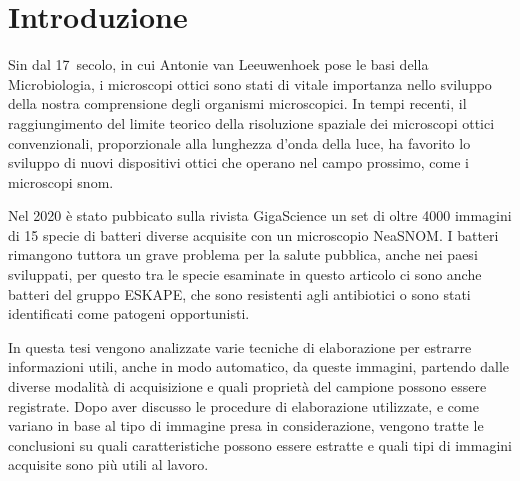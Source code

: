 \documentclass[../main.tex]{subfiles}
\begin{document}
\chapter*{Introduzione}
Sin dal 17\textdegree\ secolo, in cui Antonie van Leeuwenhoek pose le basi della Microbiologia\cite{lane_2015, dobell_1923, corliss_1975}, i microscopi ottici sono stati di vitale importanza nello sviluppo della nostra comprensione degli organismi microscopici.
In tempi recenti, il raggiungimento del limite teorico della risoluzione spaziale dei microscopi ottici convenzionali, proporzionale alla lunghezza d'onda della luce, ha favorito lo sviluppo di nuovi dispositivi ottici che operano nel campo prossimo, come i microscopi \gls{snom}\cite{ohtsu_2020}.

Nel 2020 è stato pubbicato sulla rivista GigaScience un set di oltre 4000 immagini di 15 specie di batteri diverse acquisite con un microscopio NeaSNOM\cite{ssnombacter}. I batteri rimangono tuttora un grave problema per la salute pubblica, anche nei paesi sviluppati, per questo tra le specie esaminate in questo articolo ci sono anche batteri del gruppo ESKAPE, che sono resistenti agli antibiotici o sono stati identificati come patogeni opportunisti.\cite{eskape}

In questa tesi vengono analizzate varie tecniche di elaborazione per estrarre informazioni utili, anche in modo automatico, da queste immagini, partendo dalle diverse modalità di acquisizione e quali proprietà del campione possono essere registrate.
Dopo aver discusso le procedure di elaborazione utilizzate, e come variano in base al tipo di immagine presa in considerazione, vengono tratte le conclusioni su quali caratteristiche possono essere estratte e quali tipi di immagini acquisite sono più utili al lavoro.\\

\end{document}
